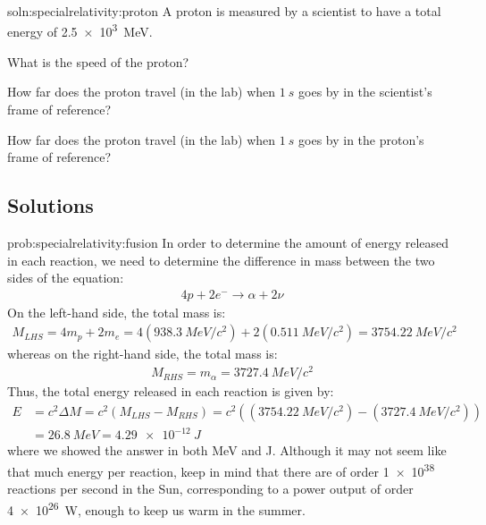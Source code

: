 \begin{problemParts}{soln:specialrelativity:proton}{\label{prob:specialrelativity:proton} 
A proton is measured by a scientist to have a total energy of \SI{2.5e3}{MeV}. }
{
\item What is the speed of the proton?
\item How far does the proton travel (in the lab) when $\SI{1}{s}$ goes by in the scientist's frame of reference?
\item How far does the proton travel (in the lab) when $\SI{1}{s}$ goes by in the proton's frame of reference?
}
\end{problemParts}

\newpage
\subsection{Solutions}
\begin{solution}{prob:specialrelativity:fusion}\label{soln:specialrelativity:fusion}
In order to determine the amount of energy released in each reaction, we need to determine the difference in mass between the two sides of the equation:
\begin{align*}
4p + 2e^- \to \alpha + 2\nu
\end{align*}
On the left-hand side, the total mass is:
\begin{align*}
M_{LHS}=4m_p+2m_e=4(\SI{938.3}{MeV/c^2})+2(\SI{0.511}{MeV/c^2})=\SI{3754.22}{MeV/c^2}
\end{align*}
whereas on the right-hand side, the total mass is:
\begin{align*}
M_{RHS}=m_\alpha=\SI{3727.4}{MeV/c^2}
\end{align*}
Thus, the total energy released in each reaction is given by:
\begin{align*}
E &= c^2\Delta M = c^2(M_{LHS}-M_{RHS})=c^2((\SI{3754.22}{MeV/c^2})-(\SI{3727.4}{MeV/c^2}))\\
&=\SI{26.8}{MeV}=\SI{4.29e-12}{J}
\end{align*}
where we showed the answer in both \si{MeV} and \si{J}. Although it may not seem like that much energy per reaction, keep in mind that there are of order \num{1e38} reactions per second in the Sun, corresponding to a power output of order \SI{4e26}{W}, enough to keep us warm in the summer.
\end{solution}


